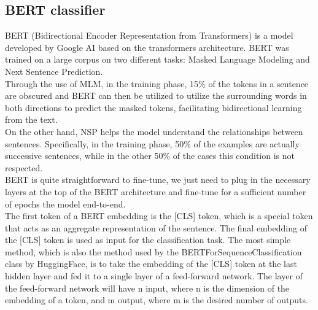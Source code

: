 \subsection{BERT classifier}
BERT (Bidirectional Encoder Representation from Transformers) is a model developed by Google AI based on the transformers architecture. BERT was trained on a large corpus on two different tasks: Masked Language Modeling and Next Sentence Prediction. \\
Through the use of MLM, in the training phase, 15\% of the tokens in a sentence are obscured and BERT can then be utilized to utilize the surrounding words in both directions to predict the masked tokens, facilitating bidirectional learning from the text. \\
On the other hand, NSP helps the model understand the relationships between sentences. Specifically, in the training phase, 50\% of the examples are actually successive sentences, while in the other 50\% of the cases this condition is not respected. \\
BERT is quite straightforward to fine-tune, we just need to plug in the necessary layers at the top of the BERT architecture and fine-tune for a sufficient number of epochs the model end-to-end. \\
The first token of a BERT embedding is the [CLS] token, which is a special token that acts as an aggregate representation of the sentence. The final embedding of the [CLS] token is used as input for the classification task. The most simple method, which is also the method used by the BERTForSequenceClassification class by HuggingFace, is to take the embedding of the [CLS] token at the last hidden layer and fed it to a single layer of a feed-forward network. The layer of the feed-forward network will have n input, where n is the dimension of the embedding of a token, and m output, where m is the desired number of outputs. \\
 



